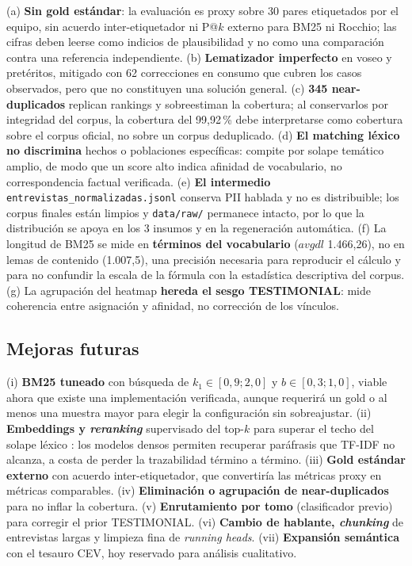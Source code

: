 \documentclass[11pt]{tg_usta}
\begin{document}
(a) \textbf{Sin gold estándar}: la evaluación es proxy sobre 30 pares etiquetados por el equipo, sin acuerdo inter-etiquetador ni P@$k$ externo para BM25 ni Rocchio; las cifras deben leerse como indicios de plausibilidad y no como una comparación contra una referencia independiente. (b) \textbf{Lematizador imperfecto} en voseo y pretéritos, mitigado con 62 correcciones en consumo que cubren los casos observados, pero que no constituyen una solución general. (c) \textbf{345 near-duplicados} replican rankings y sobreestiman la cobertura; al conservarlos por integridad del corpus, la cobertura del 99,92\,\% debe interpretarse como cobertura sobre el corpus oficial, no sobre un corpus deduplicado. (d) \textbf{El matching léxico no discrimina} hechos o poblaciones específicas: compite por solape temático amplio, de modo que un score alto indica afinidad de vocabulario, no correspondencia factual verificada. (e) \textbf{El intermedio} \texttt{entrevistas\_normalizadas.jsonl} conserva PII hablada y no es distribuible; los corpus finales están limpios y \texttt{data/raw/} permanece intacto, por lo que la distribución se apoya en los 3 insumos y en la regeneración automática. (f) La longitud de BM25 se mide en \textbf{términos del vocabulario} ($avgdl$ 1.466,26), no en lemas de contenido (1.007,5), una precisión necesaria para reproducir el cálculo y para no confundir la escala de la fórmula con la estadística descriptiva del corpus. (g) La agrupación del heatmap \textbf{hereda el sesgo TESTIMONIAL}: mide coherencia entre asignación y afinidad, no corrección de los vínculos.

\subsection{Mejoras futuras}

(i) \textbf{BM25 tuneado} con búsqueda de $k_1\in[0{,}9;2{,}0]$ y $b\in[0{,}3;1{,}0]$, viable ahora que existe una implementación verificada, aunque requerirá un gold o al menos una muestra mayor para elegir la configuración sin sobreajustar. (ii) \textbf{Embeddings y \textit{reranking}} supervisado del top-$k$ para superar el techo del solape léxico \cite{valentini2024messirve}: los modelos densos permiten recuperar paráfrasis que TF-IDF no alcanza, a costa de perder la trazabilidad término a término. (iii) \textbf{Gold estándar externo} con acuerdo inter-etiquetador, que convertiría las métricas proxy en métricas comparables. (iv) \textbf{Eliminación o agrupación de near-duplicados} para no inflar la cobertura. (v) \textbf{Enrutamiento por tomo} (clasificador previo) para corregir el prior TESTIMONIAL. (vi) \textbf{Cambio de hablante, \textit{chunking}} de entrevistas largas y limpieza fina de \textit{running heads}. (vii) \textbf{Expansión semántica} con el tesauro CEV, hoy reservado para análisis cualitativo.
\end{document}
